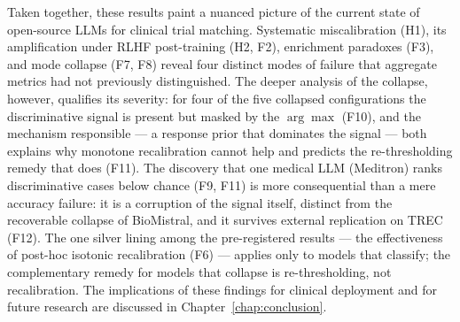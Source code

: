 Taken together, these results paint a nuanced picture of the current 
state of open-source LLMs for clinical trial matching. Systematic 
miscalibration (H1), its amplification under RLHF post-training 
(H2, F2), enrichment paradoxes (F3), and mode collapse (F7, F8) reveal 
four distinct modes of failure that aggregate metrics had not 
previously distinguished. The deeper analysis of the collapse, however, 
qualifies its severity: for four of the five collapsed configurations 
the discriminative signal is present but masked by the $\arg\max$ 
(F10), and the mechanism responsible --- a response prior that dominates 
the signal --- both explains why monotone recalibration cannot help and 
predicts the re-thresholding remedy that does (F11). The discovery that 
one medical LLM (Meditron) ranks discriminative cases below chance (F9, 
F11) is more consequential than a mere accuracy failure: it is a 
corruption of the signal itself, distinct from the recoverable collapse 
of BioMistral, and it survives external replication on TREC (F12). The 
one silver lining among the pre-registered results --- the effectiveness 
of post-hoc isotonic recalibration (F6) --- applies only to models that 
classify; the complementary remedy for models that collapse is 
re-thresholding, not recalibration. The implications of these findings 
for clinical deployment and for future research are discussed in 
Chapter~\ref{chap:conclusion}.